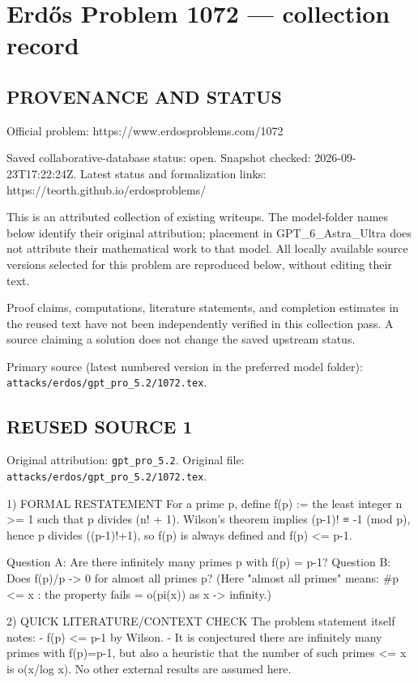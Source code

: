\section*{Erd\H{o}s Problem 1072 --- collection record}

\subsection*{PROVENANCE AND STATUS}
Official problem: https://www.erdosproblems.com/1072

Saved collaborative-database status: open.
Snapshot checked: 2026-09-23T17:22:24Z.
Latest status and formalization links: https://teorth.github.io/erdosproblems/

This is an attributed collection of existing writeups. The model-folder names below identify their original attribution; placement in GPT\_6\_Astra\_Ultra does not attribute their mathematical work to that model. All locally available source versions selected for this problem are reproduced below, without editing their text.

Proof claims, computations, literature statements, and completion estimates in the reused text have not been independently verified in this collection pass. A source claiming a solution does not change the saved upstream status.

Primary source (latest numbered version in the preferred model folder): \texttt{attacks/erdos/gpt\_pro\_5.2/1072.tex}.

\subsection*{REUSED SOURCE 1}
Original attribution: \texttt{gpt\_pro\_5.2}.
Original file: \texttt{attacks/erdos/gpt\_pro\_5.2/1072.tex}.


1) FORMAL RESTATEMENT
For a prime p, define
  f(p) := the least integer n >= 1 such that p divides (n! + 1).
Wilson's theorem implies (p-1)! ≡ -1 (mod p), hence p divides ((p-1)!+1), so f(p) is always defined and f(p) <= p-1.

Question A: Are there infinitely many primes p with f(p) = p-1?
Question B: Does f(p)/p -> 0 for almost all primes p?
(Here "almost all primes" means: #{p <= x : the property fails} = o(pi(x)) as x -> infinity.)

2) QUICK LITERATURE/CONTEXT CHECK
The problem statement itself notes:
- f(p) <= p-1 by Wilson.
- It is conjectured there are infinitely many primes with f(p)=p-1, but also a heuristic that the number of such primes <= x is o(x/log x).
No other external results are assumed here.

